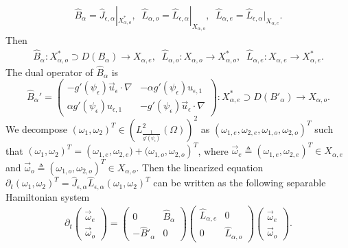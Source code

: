 \documentclass[1 [leqno, 11pt]{amsart}
\numberwithin{equation}{section}
\let\ep=\epsilon
\begin{document}
\begin{CJK*}{GBK}{song}
\begin{align*}\hat{B}_\alpha = \hat{J}_{\ep,\alpha}|_{X_{\alpha, o}^*},\;\; \hat L_{\alpha,o} = \hat {L}_{\epsilon, \alpha}|_{X_{\alpha, o}},\;\;
\hat{L}_{\alpha,e} = \hat {L}_{\epsilon, \alpha}|_{X_{\alpha, e}}.
 \end{align*}
 Then
 \begin{align*}\hat{B}_\alpha: X_{\alpha, o}^*\supset D(B_\alpha) \rightarrow X_{\alpha, e},\;\;
 \hat L_{\alpha,o}:X_{\alpha, o} \rightarrow X_{\alpha, o}^*,\;\;
 \hat L_{\alpha,e} : X_{\alpha, e} \rightarrow X_{\alpha, e}^*.
 \end{align*}
The dual operator of $\hat{B}_\alpha$ is
$$\hat{B}_\alpha'= \left( \begin{array}{cc} -g'(\psi_\epsilon)\vec{u}_\epsilon\cdot\nabla & -\alpha g'(\psi_\epsilon)u_{\ep,1}\\ \alpha g'(\psi_\epsilon)u_{\ep,1} & -g'(\psi_\epsilon)\vec{u}_\epsilon\cdot\nabla \end{array} \right) : X_{\alpha, e}^* \supset D(B'_\alpha) \rightarrow X_{\alpha, o}.$$
We decompose $\left( \omega_1, \omega_2  \right)^T \in \left(L^2_{\frac{1}{g'(\psi_\ep)}}(\Omega)\right)^2$ as $ \left( \omega_{1,e}, \omega_{2,e}, \omega_{1,o}, \omega_{2,o} \right)^T $ such that $\left( \omega_1, \omega_2  \right)^T = \left( \omega_{1,e}, \omega_{2,e})+(\omega_{1,o},  \omega_{2,o} \right)^T$, where
$\vec{\omega}_{e}\triangleq\left( \omega_{1,e}, \omega_{2,e} \right)^T \in X_{\alpha, e}$ and $\vec{\omega}_{o}\triangleq\left(  \omega_{1,o}, \omega_{2,o} \right)^T  \in X_{\alpha, o}$. Then the linearized equation $\partial_t(\omega_1,\omega_2)^T=\hat{J}_{\ep,\alpha} \hat {L}_{\epsilon, \alpha}(\omega_1,\omega_2)^T$ can be written as  the following separable Hamiltonian system
\begin{align}\label{sep-hamiltonian-alpha}
\partial_t \left( \begin{array}{c}\vec{\omega}_{e} \\ \vec{\omega}_{o} \end{array} \right) = \left( \begin{array}{cc} 0 & \hat{B}_\alpha \\ -\hat{B}'_\alpha & 0 \end{array} \right)\left( \begin{array}{cc} \hat{L}_{\alpha,e} & 0 \\ 0 & \hat{L}_{\alpha,o} \end{array} \right) \left( \begin{array}{c} \vec{\omega}_{e} \\ \vec{\omega}_{o}\end{array} \right).

\end{align}
\end{CJK*}
\end{document}
